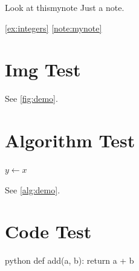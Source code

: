 \documentclass{article}
\begin{document}
\begin{note}{Look at this}{mynote}
  Just a note.
\end{note}

\cref{ex:integers}
\cref{note:mynote}

\section*{Img Test}

See \cref{fig:demo}.
\section*{Algorithm Test}
\begin{algorithm}[htbp]
  \caption{Demo algorithm}
  \label{alg:demo}
  \BlankLine
  $y \leftarrow x$
\end{algorithm}

See \cref{alg:demo}.

\section*{Code Test}
\begin{hypocode}{python}
def add(a, b):
  return a + b
\end{hypocode}
\end{document}
